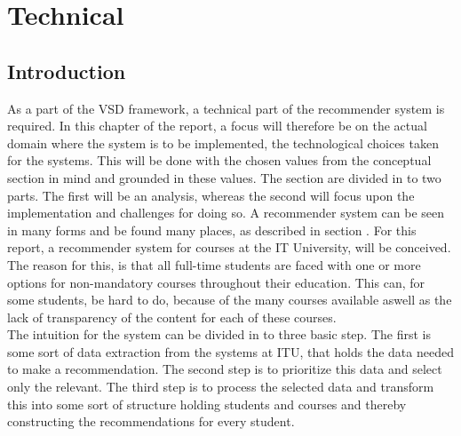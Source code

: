 
 
\section{Technical}

\subsection{Introduction}
As a part of the VSD framework, a technical part of the recommender system is required. In this chapter of the report, a focus will therefore be on the actual domain where the system is to be implemented, the technological choices taken for the systems. This will be done with the chosen values from the conceptual section in mind and grounded in these values. 
The section are divided in to two parts. The first will be an analysis, whereas the second will focus upon the implementation and challenges for doing so. 
A recommender system can be seen in many forms and be found many places, as described in section . For this report, a recommender system for courses at the IT University, will be conceived. The reason for this, is that all full-time students are faced with one or more options for non-mandatory courses throughout their education. This can, for some students, be hard to do, because of the many courses available aswell as the lack of transparency of the content for each of these courses.\\

The intuition for the system can be divided in to three basic step. The first is some sort of data extraction from the systems at ITU, that holds the data needed to make a recommendation. The second step is to prioritize this data and select only the relevant. The third step is to process the selected data and transform this into some sort of structure holding students and courses and thereby constructing the recommendations for every student.


